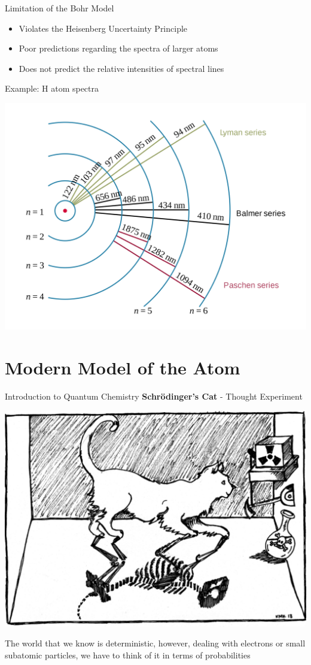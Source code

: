 \documentclass[11pt]{beamer}
\begin{document}
\begin{frame}{Limitation of the Bohr Model}
  \begin{itemize}
  \item Violates the Heisenberg Uncertainty Principle
  \item Poor predictions regarding the spectra of larger
    atoms
  \item Does not predict the relative intensities of spectral
    lines
  \end{itemize}
\end{frame}

\begin{frame}{Example: H atom spectra}
  \begin{center}
    \includegraphics[scale=0.09]{h_spectra}
  \end{center}
\end{frame}

\section{Modern Model of the Atom}

\begin{frame}{Introduction to Quantum Chemistry}
  \textbf{Schr\"{o}dinger's Cat} - Thought Experiment
  \begin{center}
    \includegraphics[width=0.65\linewidth]{schor_cat}
  \end{center}

  The world that we know is deterministic, however, dealing
  with electrons or small subatomic particles, we have to think
  of it in terms of probabilities
\end{frame}
\end{document}
